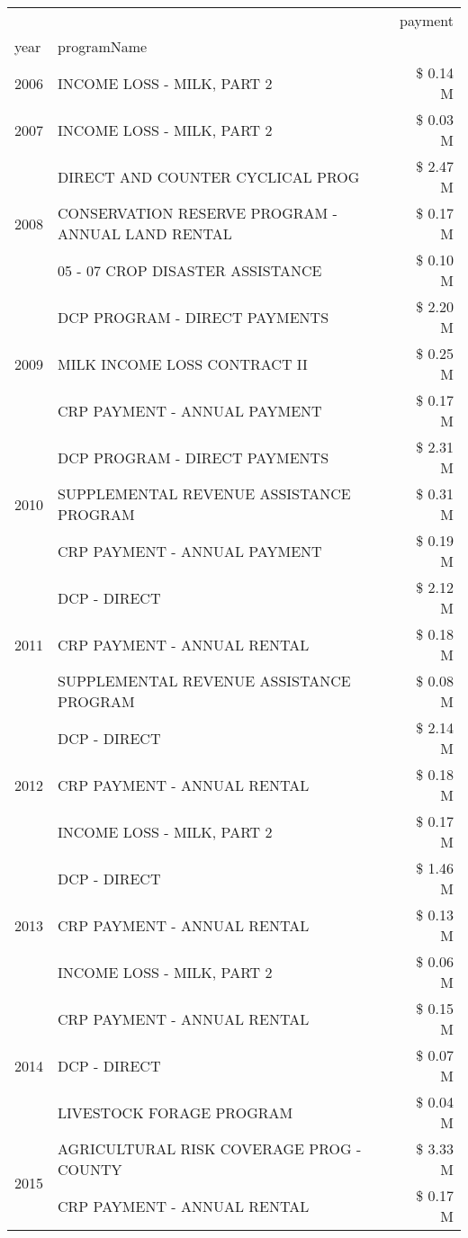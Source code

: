 \begin{tabular}{llr}
\toprule
 &  & payment \\
year & programName &  \\
\midrule
2006 & INCOME LOSS - MILK, PART 2 & \$ 0.14 M \\
\cline{1-3}
2007 & INCOME LOSS - MILK, PART 2 & \$ 0.03 M \\
\cline{1-3}
\multirow[t]{3}{*}{2008} & DIRECT AND COUNTER CYCLICAL PROG & \$ 2.47 M \\
 & CONSERVATION RESERVE PROGRAM - ANNUAL LAND RENTAL & \$ 0.17 M \\
 & 05 - 07 CROP DISASTER ASSISTANCE & \$ 0.10 M \\
\cline{1-3}
\multirow[t]{3}{*}{2009} & DCP PROGRAM - DIRECT PAYMENTS & \$ 2.20 M \\
 & MILK INCOME LOSS CONTRACT II & \$ 0.25 M \\
 & CRP PAYMENT - ANNUAL PAYMENT & \$ 0.17 M \\
\cline{1-3}
\multirow[t]{3}{*}{2010} & DCP PROGRAM - DIRECT PAYMENTS & \$ 2.31 M \\
 & SUPPLEMENTAL REVENUE ASSISTANCE PROGRAM & \$ 0.31 M \\
 & CRP PAYMENT - ANNUAL PAYMENT & \$ 0.19 M \\
\cline{1-3}
\multirow[t]{3}{*}{2011} & DCP - DIRECT & \$ 2.12 M \\
 & CRP PAYMENT - ANNUAL RENTAL & \$ 0.18 M \\
 & SUPPLEMENTAL REVENUE ASSISTANCE PROGRAM & \$ 0.08 M \\
\cline{1-3}
\multirow[t]{3}{*}{2012} & DCP - DIRECT & \$ 2.14 M \\
 & CRP PAYMENT - ANNUAL RENTAL & \$ 0.18 M \\
 & INCOME LOSS - MILK, PART 2 & \$ 0.17 M \\
\cline{1-3}
\multirow[t]{3}{*}{2013} & DCP - DIRECT & \$ 1.46 M \\
 & CRP PAYMENT - ANNUAL RENTAL & \$ 0.13 M \\
 & INCOME LOSS - MILK, PART 2 & \$ 0.06 M \\
\cline{1-3}
\multirow[t]{3}{*}{2014} & CRP PAYMENT - ANNUAL RENTAL & \$ 0.15 M \\
 & DCP - DIRECT & \$ 0.07 M \\
 & LIVESTOCK FORAGE PROGRAM & \$ 0.04 M \\
\cline{1-3}
\multirow[t]{3}{*}{2015} & AGRICULTURAL RISK COVERAGE PROG - COUNTY & \$ 3.33 M \\
 & CRP PAYMENT - ANNUAL RENTAL & \$ 0.17 M \\

\end{tabular}
